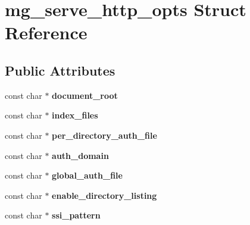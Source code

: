\hypertarget{structmg__serve__http__opts}{}\section{mg\+\_\+serve\+\_\+http\+\_\+opts Struct Reference}
\label{structmg__serve__http__opts}
\subsection*{Public Attributes}
\begin{DoxyCompactItemize}
\item 
const char $\ast$ {\bfseries document\+\_\+root}\hypertarget{structmg__serve__http__opts_ac0cc1c435a0eff10416dab5dc72bb286}{}\label{structmg__serve__http__opts_ac0cc1c435a0eff10416dab5dc72bb286}

\item 
const char $\ast$ {\bfseries index\+\_\+files}\hypertarget{structmg__serve__http__opts_accaf556b9e7685a20380a398788b182b}{}\label{structmg__serve__http__opts_accaf556b9e7685a20380a398788b182b}

\item 
const char $\ast$ {\bfseries per\+\_\+directory\+\_\+auth\+\_\+file}\hypertarget{structmg__serve__http__opts_ac8fe82b68741c2b4dd605786450a31cd}{}\label{structmg__serve__http__opts_ac8fe82b68741c2b4dd605786450a31cd}

\item 
const char $\ast$ {\bfseries auth\+\_\+domain}\hypertarget{structmg__serve__http__opts_a669d52169dca38a9ac7f7830a3f6cf85}{}\label{structmg__serve__http__opts_a669d52169dca38a9ac7f7830a3f6cf85}

\item 
const char $\ast$ {\bfseries global\+\_\+auth\+\_\+file}\hypertarget{structmg__serve__http__opts_a1b9e509dd66423542acb98d449c1c90b}{}\label{structmg__serve__http__opts_a1b9e509dd66423542acb98d449c1c90b}

\item 
const char $\ast$ {\bfseries enable\+\_\+directory\+\_\+listing}\hypertarget{structmg__serve__http__opts_a98d22c53213726743cb7677490e12956}{}\label{structmg__serve__http__opts_a98d22c53213726743cb7677490e12956}

\item 
const char $\ast$ {\bfseries ssi\+\_\+pattern}\hypertarget{structmg__serve__http__opts_a1c75e2011dd68bffbfb415d126f89c4c}{}\label{structmg__serve__http__opts_a1c75e2011dd68bffbfb415d126f89c4c}


\end{DoxyCompactItemize}
